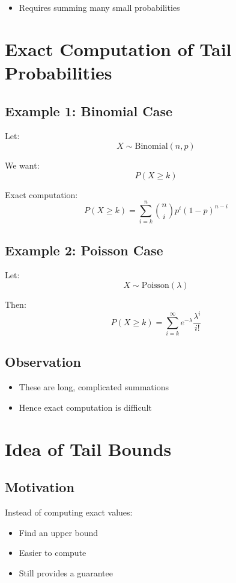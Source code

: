\documentclass[12pt]{article}
\begin{document}
\begin{itemize}
    \item Requires summing many small probabilities
\end{itemize}

\section{Exact Computation of Tail Probabilities}

\subsection{Example 1: Binomial Case}

Let:
\[
X \sim \text{Binomial}(n, p)
\]

We want:
\[
P(X \ge k)
\]

Exact computation:
\[
P(X \ge k) = \sum_{i=k}^{n} \binom{n}{i} p^i (1-p)^{n-i}
\]

\subsection{Example 2: Poisson Case}

Let:
\[
X \sim \text{Poisson}(\lambda)
\]

Then:
\[
P(X \ge k) = \sum_{i=k}^{\infty} e^{-\lambda} \frac{\lambda^i}{i!}
\]

\subsection{Observation}

\begin{itemize}
    \item These are long, complicated summations
    \item Hence exact computation is difficult
\end{itemize}

\newpage
\section{Idea of Tail Bounds}

\subsection{Motivation}

Instead of computing exact values:

\begin{itemize}
    \item Find an upper bound
    \item Easier to compute
    \item Still provides a guarantee
\end{itemize}
\end{document}

